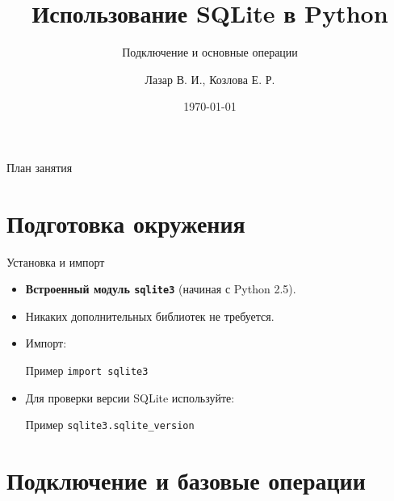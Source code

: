 \documentclass{beamer}
\title{Использование SQLite в Python}
\subtitle{Подключение и основные операции}
\author{Лазар В. И., Козлова Е. Р.}
\date{\today}
\begin{document}
\begin{frame}
	\titlepage
\end{frame}

\begin{frame}{План занятия}
	\tableofcontents
\end{frame}

\section{Подготовка окружения}

\begin{frame}{Установка и импорт}
	\begin{itemize}
		\item \textbf{Встроенный модуль \texttt{sqlite3}} (начиная с Python 2.5).
		\item Никаких дополнительных библиотек не требуется.
		\item Импорт:
		      \begin{block}{Пример}
			      \texttt{import sqlite3}
		      \end{block}
		\item Для проверки версии SQLite используйте:
		      \begin{block}{Пример}
			      \texttt{sqlite3.sqlite\_version}
		      \end{block}
	\end{itemize}
\end{frame}

\section{Подключение и базовые операции}
\end{document}

